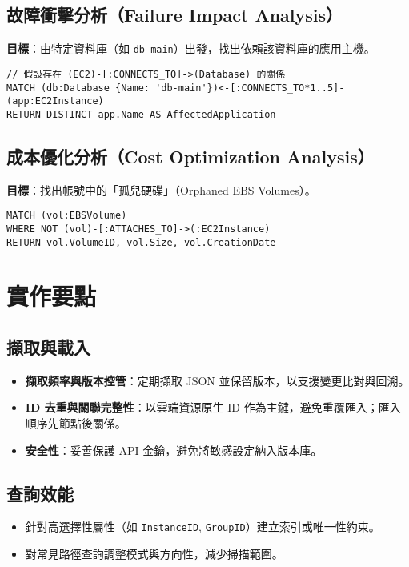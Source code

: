 \documentclass[11pt,a4paper]{ctexart}
\begin{document}
\subsection{故障衝擊分析（Failure Impact Analysis）}
\textbf{目標}：由特定資料庫（如 \texttt{db-main}）出發，找出依賴該資料庫的應用主機。

\begin{lstlisting}[language=Cypher,caption={由資料庫反向追蹤依賴它的應用主機}]
// 假設存在 (EC2)-[:CONNECTS_TO]->(Database) 的關係
MATCH (db:Database {Name: 'db-main'})<-[:CONNECTS_TO*1..5]-(app:EC2Instance)
RETURN DISTINCT app.Name AS AffectedApplication
\end{lstlisting}

\subsection{成本優化分析（Cost Optimization Analysis）}
\textbf{目標}：找出帳號中的「孤兒硬碟」（Orphaned EBS Volumes）。

\begin{lstlisting}[language=Cypher,caption={找出未連接至任何 EC2 的 EBS 磁碟}]
MATCH (vol:EBSVolume)
WHERE NOT (vol)-[:ATTACHES_TO]->(:EC2Instance)
RETURN vol.VolumeID, vol.Size, vol.CreationDate
\end{lstlisting}

\section{實作要點}
\subsection{擷取與載入}
\begin{itemize}[leftmargin=1.5em]
\item \textbf{擷取頻率與版本控管}：定期擷取 JSON 並保留版本，以支援變更比對與回溯。
\item \textbf{ID 去重與關聯完整性}：以雲端資源原生 ID 作為主鍵，避免重覆匯入；匯入順序先節點後關係。
\item \textbf{安全性}：妥善保護 API 金鑰，避免將敏感設定納入版本庫。
\end{itemize}

\subsection{查詢效能}
\begin{itemize}[leftmargin=1.5em]
\item 針對高選擇性屬性（如 \texttt{InstanceID}, \texttt{GroupID}）建立索引或唯一性約束。
\item 對常見路徑查詢調整模式與方向性，減少掃描範圍。
\end{itemize}
\end{document}
